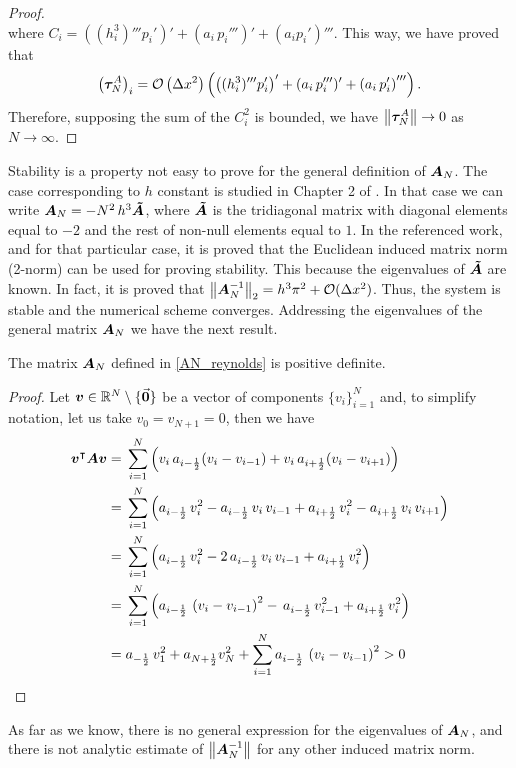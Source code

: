 \begin{proposition}
\begin{proof}
\begin{equation*}
\end{equation*}
where $C_i=\left(\left(h_i^3\right)'''p_i'\right)'+(a_i\,p_i''')'+\left(a_ip_i'\right)'''$.  This way, we have proved that
\begin{equation}
\left(\bds{\tau}_N^A\right)_i=\mathcal{O}\left(
\Delta x^2\right)\left( \left((h_i^3)'''p_i'\right)'+(a_i\,p_i''')'
+\left(a_i\,p_i'\right)'''\right).\label{eq:tau_A_trunc_order}
\end{equation}
Therefore, supposing the sum of the $C_i^2$ is bounded, we have $\left\lVert\boldsymbol{\tau}_N^A\right\rVert\rightarrow 0$ as $N\rightarrow \infty$.
\end{proof}
\end{proposition}
Stability is a property not easy to prove for the general definition of $\boldsymbol{A}_N$. The case corresponding to $h$ constant is studied in Chapter 2 of \cite{leveque2007}. In that case we can write $\boldsymbol{A}_N=-N^2\,h^3\boldsymbol{\tilde{A}}$, where $\boldsymbol{\tilde{A}}$ is the tridiagonal matrix with diagonal elements equal to $-2$ and the rest of non-null elements equal to $1$. In the referenced work, and for that particular case, it is proved that the Euclidean induced matrix norm (2-norm) can be used for proving stability. This because the eigenvalues of $\boldsymbol{\tilde{A}}$ are known. In fact, it is proved that $\left\Vert\boldsymbol{A}_N^{-1}\right\Vert_2=h^3\pi^2+\mathcal{O}(\Delta x ^2)$. Thus, the system is stable and the numerical scheme converges. Addressing the eigenvalues of the general matrix $\boldsymbol{A}_N$ we have the next result.

\begin{proposition}\label{prop:An_definite_positive}
The matrix $\boldsymbol{A}_N$ defined in \eqref{AN_reynolds} is positive definite.
\begin{proof}
Let $\boldsymbol{v}\in \mathbb{R}^N\setminus \{\vec{\mathbf{0}}\}$ be a vector of components $\{v_i\}_{i=1}^N$ and, to simplify notation, let us take $v_0=v_{N+1}=0$, then we have
\begin{align*}
\boldsymbol{v}^\intercal\boldsymbol{A}\boldsymbol{v}={}&\sum_{i=1}^N\left(v_i\,a_{i-\frac{1}{2}} (v_i-v_{i-1})+v_i\,a_{i+\frac{1}{2}}(v_i-v_{i+1})\right)\\
={}&\sum_{i=1}^N\left(a_{i-\frac{1}{2}}\,v_i^2-a_{i-\frac{1}{2}}\,v_i\,v_{i-1}+ a_{i+\frac{1}{2}}\,v_i^2 -a_{i+\frac{1}{2}}\,v_i\,v_{i+1}\right)\\
={}&\sum_{i=1}^{N}\left(a_{i-\frac{1}{2}}\,v_i^2-2\,a_{i-\frac{1}{2}}\,v_i\,v_{i-1}+ a_{i+\frac{1}{2}}\,v_i^2 \right)\\
={}&\sum_{i=1}^{N}\left(a_{i-\frac{1}{2}}\,\left(v_i-v_{i-1}\right)^2-\,a_{i-\frac{1}{2}}\,v_{i-1}^2+ a_{i+\frac{1}{2}}\,v_i^2\right)\\
={}&a_{-\frac{1}{2}}\,v_1^2+a_{N+\frac{1}{2}}v_N^2+\sum_{i=1}^{N}a_{i-\frac{1}{2}}\,\left(v_i-v_{i-1}\right)^2>0
\end{align*}
\end{proof}
\end{proposition}
As far as we know, there is no general expression for the eigenvalues of $\boldsymbol{A}_N$, and there is not analytic estimate of $\left\Vert\boldsymbol{A}_N^{-1}\right\Vert$ for any other induced matrix norm.

